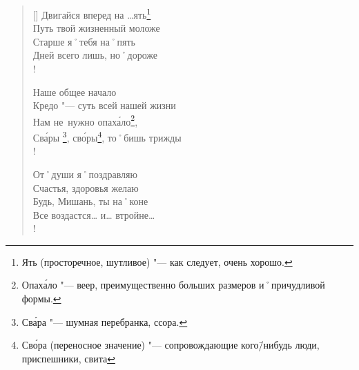\begin{verse}[\versewidth]
Двигайся вперед на …ять\footnote{Ять (просторечное, шутливое) "--- как следует, очень хорошо.}      \\
Путь твой жизненный моложе     \\
Старше я˚тебя на˚пять          \\
Дней всего лишь, но˚дороже \\!


\vin Наше общее начало              \\
\vin Кредо "--- суть всей нашей жизни  \\
\vin Нам не~нужно опах\'{а}ло\footnote{Опах\'{а}ло "--- веер, преимущественно больших размеров и˚причудливой формы.},          \\
\vin Св\'{а}ры \footnote{Св\'{а}ра "--- шумная перебранка, ссора.}, св\'{о}ры\footnote{Св\'{о}ра (переносное значение) "--- сопровождающие кого\=/нибудь люди, приспешники, свита}, то˚бишь трижды \\!

От˚души я˚поздравляю           \\
Счастья, здоровья желаю        \\
Будь, Мишань, ты на˚коне       \\
Все воздастся… и… втройне…		\\!
\end{verse}


